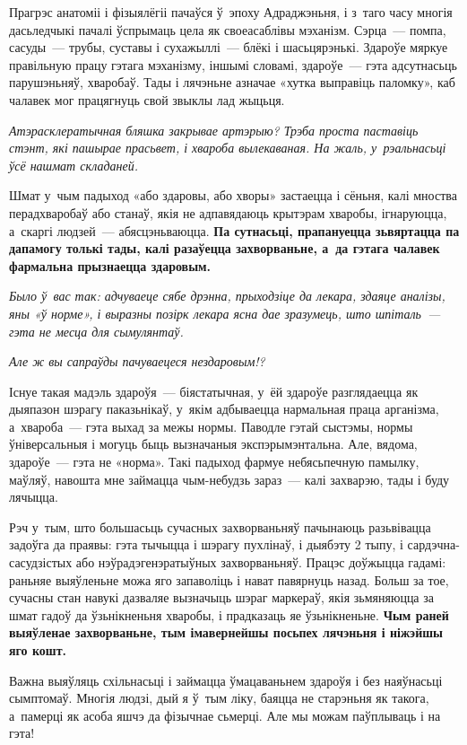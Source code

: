 Прагрэс анатоміі і фізыялёгіі пачаўся ў~эпоху Адраджэньня, і з~таго часу многія дасьледчыкі пачалі ўспрымаць цела як своеасаблівы мэханізм. Сэрца~--- помпа, сасуды~--- трубы, суставы і сухажыллі~--- блёкі і шасьцярэнькі. Здароўе мяркуе правільную працу гэтага мэханізму, іншымі словамі, здароўе~--- гэта адсутнасьць парушэньняў, хваробаў. Тады і лячэньне азначае «хутка выправіць паломку», каб чалавек мог працягнуць свой звыклы лад жыцьця.

\emph{Атэрасклератычная бляшка закрывае артэрыю? Трэба проста паставіць стэнт, які пашырае прасьвет, і хвароба вылекаваная. На жаль, у~рэальнасьці ўсё нашмат складаней.}

Шмат у~чым падыход «або здаровы, або хворы» застаецца і сёньня, калі мноства перадхваробаў або станаў, якія не адпавядаюць крытэрам хваробы, ігнаруюцца, а~скаргі людзей~--- абясцэньваюцца. \textbf{Па сутнасьці, прапануецца зьвяртацца па дапамогу толькі тады, калі разаўецца захворваньне, а~да гэтага чалавек фармальна прызнаецца здаровым.}

\emph{Было ў~вас так: адчуваеце сябе дрэнна, прыходзіце да лекара, здаяце аналізы, яны «ў норме», і выразны позірк лекара ясна дае зразумець, што шпіталь~--- гэта не месца для сымулянтаў.}

\emph{Але ж вы сапраўды пачуваецеся нездаровым!?}

Існуе такая мадэль здароўя~--- біястатычная, у~ёй здароўе разглядаецца як дыяпазон шэрагу паказьнікаў, у~якім адбываецца нармальная праца арганізма, а~хвароба~--- гэта выхад за межы нормы. Паводле гэтай сыстэмы, нормы ўніверсальныя і могуць быць вызначаныя экспэрымэнтальна. Але, вядома, здароўе~--- гэта не «норма». Такі падыход фармуе небясьпечную памылку, маўляў, навошта мне займацца чым-небудзь зараз~--- калі захварэю, тады і буду лячыцца.

Рэч у~тым, што большасьць сучасных захворваньняў пачынаюць разьвівацца задоўга да праявы: гэта тычыцца і шэрагу пухлінаў, і дыябэту 2 тыпу, і сардэчна-сасудзістых або нэўрадэгенэратыўных захворваньняў. Працэс доўжыцца гадамі: раньняе выяўленьне можа яго запаволіць і нават павярнуць назад. Больш за тое, сучасны стан навукі дазваляе вызначыць шэраг маркераў, якія зьмяняюцца за шмат гадоў да ўзьнікненьня хваробы, і прадказаць яе ўзьнікненьне. \textbf{Чым раней выяўленае захворваньне, тым імавернейшы посьпех лячэньня і ніжэйшы яго кошт.}

Важна выяўляць схільнасьці і займацца ўмацаваньнем здароўя і без наяўнасьці сымптомаў. Многія людзі, дый я ў~тым ліку, баяцца не старэньня як такога, а~памерці як асоба яшчэ да фізычнае сьмерці. Але мы можам паўплываць і на гэта!

